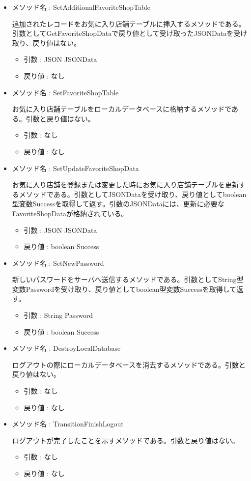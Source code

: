 \documentclass[a4j]{jarticle}
\begin{document}
\begin{itemize}
     \item メソッド名 : SetAdditionalFavoriteShopTable

	追加されたレコードをお気に入り店舗テーブルに挿入するメソッドである。引数としてGetFavoriteShopDataで戻り値として受け取ったJSONDataを受け取り、戻り値はない。
     \begin{itemize}
		\item 引数 : JSON JSONData
		\item 戻り値 : なし
	\end{itemize}

	\item メソッド名 : SetFavoriteShopTable

	お気に入り店舗テーブルをローカルデータベースに格納するメソッドである。引数と戻り値はない。
	\begin{itemize}
		\item 引数 : なし
		\item 戻り値 : なし
	\end{itemize}

	\item メソッド名 : SetUpdateFavoriteShopData

	お気に入り店舗を登録または変更した時にお気に入り店舗テーブルを更新するメソッドである。引数としてJSONDataを受け取り、戻り値としてboolean型変数Successを取得して返す。引数のJSONDataには、更新に必要なFavoriteShopDataが格納されている。
	\begin{itemize}
		\item 引数 : JSON JSONData
		\item 戻り値 : boolean Success
	\end{itemize}

	\item メソッド名 : SetNewPassword

	新しいパスワードをサーバへ送信するメソッドである。引数としてString型変数Passwordを受け取り、戻り値としてboolean型変数Successを取得して返す。
        \begin{itemize}
	\item 引数 : String Password
	\item 戻り値 : boolean Success
	\end{itemize}

      \item メソッド名 : DestroyLocalDatabase

	ログアウトの際にローカルデータベースを消去するメソッドである。引数と戻り値はない。
	\begin{itemize}
	\item 引数 : なし
	\item 戻り値 : なし
	\end{itemize}

	\item メソッド名 : TransitionFinishLogout

	ログアウトが完了したことを示すメソッドである。引数と戻り値はない。
	\begin{itemize}
		\item 引数 : なし
		\item 戻り値 : なし
	\end{itemize}


\end{itemize}
\end{document}
